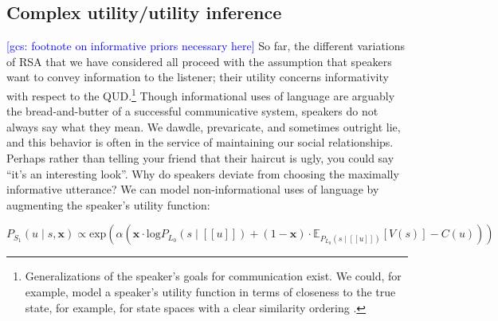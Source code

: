 \documentclass{sp}
\newcommand{\gcs}[1]{\textcolor{blue}{[gcs: #1]}}
\newcommand{\sem}[1]{\ensuremath{[\![#1]\!]}}
\begin{document}
\subsection{Complex utility/utility inference}
 
 \gcs{footnote on informative priors necessary here}
 So far, the different variations of RSA that we have considered all proceed with the assumption that speakers want to convey information to the listener; their utility concerns informativity with respect to the QUD.\footnote{Generalizations of the speaker's goals for communication exist. We could, for example, model a speaker's utility function in terms of closeness to the true state, for example, for state spaces with a clear similarity ordering \citep{Franke2014:Typical-use-of-}.} Though informational uses of language are arguably the bread-and-butter of a successful communicative system, speakers do not always say what they mean. We dawdle, prevaricate, and sometimes outright lie, and this behavior is often in the service of maintaining our social relationships. Perhaps rather than telling your friend that their haircut is ugly, you could say ``it's an interesting look''. Why do speakers deviate from choosing the maximally informative utterance? We can model non-informational uses of language by augmenting the speaker's utility function: 
  
 \begin{equation} \label{S1-polite}
P_{S_1}(u\mid s, \textbf{x}) \propto \textrm{exp}(\alpha  (
 \textbf{x} \cdot \textrm{log}P_{L_0}(s \mid \sem{u}) + 
 (1 - \textbf{x}) \cdot  \mathbb{E}_{P_{L_0}(s \mid \sem{u})}[V(s)] - C(u)))
\end{equation}
\end{document}
